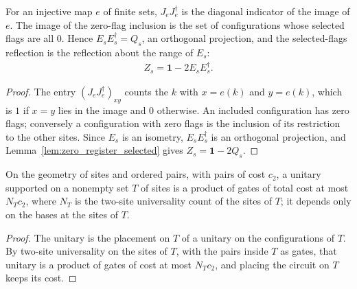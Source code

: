 \begin{lemma}
    \label{lem:zero_register_flag_projection}
    \leanok
    For an injective map $e$ of finite sets, $J_eJ_e^\dagger$ is the diagonal indicator of the
    image of $e$. The image of the zero-flag inclusion is the set of configurations whose
    selected flags are all $0$. Hence $E_sE_s^\dagger=Q_s$, an orthogonal projection, and the
    selected-flags reflection is the reflection about the range of $E_s$:
    \begin{align}
        Z_s=\mathbf 1-2E_sE_s^\dagger.
    \end{align}
\end{lemma}
\begin{proof}\leanok
    The entry $(J_eJ_e^\dagger)_{xy}$ counts the $k$ with $x=e(k)$ and $y=e(k)$, which is $1$
    if $x=y$ lies in the image and $0$ otherwise. An included configuration has zero flags;
    conversely a configuration with zero flags is the inclusion of its restriction to the
    other sites. Since $E_s$ is an isometry, $E_sE_s^\dagger$ is an orthogonal projection, and
    Lemma~\ref{lem:zero_register_selected} gives $Z_s=\mathbf 1-2Q_s$.
\end{proof}

\begin{lemma}
    \label{lem:zero_register_region_unitary}
    \leanok
    On the geometry of sites and ordered pairs, with pairs of cost $c_2$, a unitary supported on
    a nonempty set $T$ of sites is a product of gates of total cost at most $N_Tc_2$, where
    $N_T$ is the two-site universality count of the sites of $T$; it depends only on the
    bases at the sites of $T$.
\end{lemma}
\begin{proof}\leanok
    The unitary is the placement on $T$ of a unitary on the configurations of $T$. By two-site
    universality on the sites of $T$, with the pairs inside $T$ as gates, that unitary is a
    product of gates of cost at most $N_Tc_2$, and placing the circuit on $T$ keeps its cost.
\end{proof}

